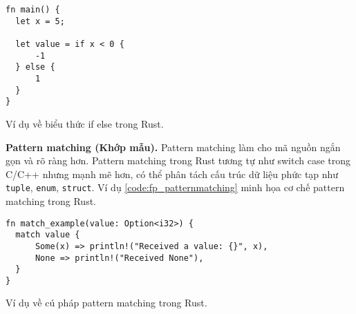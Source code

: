 \begin{listing}[H]
\begin{verbatim}
fn main() {
  let x = 5;

  let value = if x < 0 {
      -1
  } else {
      1
  }
}
\end{verbatim}
\caption{Ví dụ về biểu thức if else trong Rust.}
\label{code:fp_expression}
\end{listing}

\textbf{Pattern matching (Khớp mẫu).}
Pattern matching làm cho mã nguồn ngắn gọn và rõ ràng hơn.
Pattern matching trong Rust tương tự như switch case trong C/C++ nhưng mạnh mẽ hơn, có thể phân tách cấu trúc dữ liệu phức tạp như \texttt{tuple}, \texttt{enum}, \texttt{struct}.
Ví dụ \ref{code:fp_patternmatching} minh họa cơ chế pattern matching trong Rust.

\begin{listing}[H]
\begin{verbatim}
fn match_example(value: Option<i32>) {
  match value {
      Some(x) => println!("Received a value: {}", x),
      None => println!("Received None"),
  }
}
\end{verbatim}
\caption{Ví dụ về cú pháp pattern matching trong Rust.}
\label{code:fp_patternmatching}
\end{listing}




